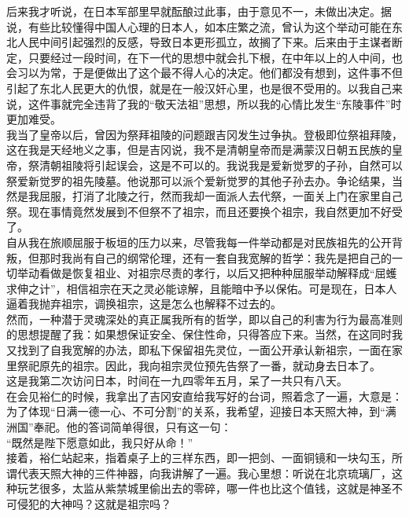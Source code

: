 后来我才听说，在日本军部里早就酝酿过此事，由于意见不一，未做出决定。据说，有些比较懂得中国人心理的日本人，如本庄繁之流，曾认为这个举动可能在东北人民中间引起强烈的反感，导致日本更形孤立，故搁了下来。后来由于主谋者断定，只要经过一段时间，在下一代的思想中就会扎下根，在中年以上的人中间，也会习以为常，于是便做出了这个最不得人心的决定。他们都没有想到，这件事不但引起了东北人民更大的仇恨，就是在一般汉奸心里，也是很不受用的。以我自己来说，这件事就完全违背了我的“敬天法祖”思想，所以我的心情比发生“东陵事件”时更加难受。\\

我当了皇帝以后，曾因为祭拜祖陵的问题跟吉冈发生过争执。登极即位祭祖拜陵，这在我是天经地义之事，但是吉冈说，我不是清朝皇帝而是满蒙汉日朝五民族的皇帝，祭清朝祖陵将引起误会，这是不可以的。我说我是爱新觉罗的子孙，自然可以祭爱新觉罗的祖先陵墓。他说那可以派个爱新觉罗的其他子孙去办。争论结果，当然是我屈服，打消了北陵之行，然而我却一面派人去代祭，一面关上门在家里自己祭。现在事情竟然发展到不但祭不了祖宗，而且还要换个祖宗，我自然更加不好受了。\\

自从我在旅顺屈服于板垣的压力以来，尽管我每一件举动都是对民族祖先的公开背叛，但那时我尚有自己的纲常伦理，还有一套自我宽解的哲学：我先是把自己的一切举动看做是恢复祖业、对祖宗尽责的孝行，以后又把种种屈服举动解释成“屈蠖求伸之计”，相信祖宗在天之灵必能谅解，且能暗中予以保佑。可是现在，日本人逼着我抛弃祖宗，调换祖宗，这是怎么也解释不过去的。\\

然而，一种潜于灵魂深处的真正属我所有的哲学，即以自己的利害为行为最高准则的思想提醒了我：如果想保证安全、保住性命，只得答应下来。当然，在这同时我又找到了自我宽解的办法，即私下保留祖先灵位，一面公开承认新祖宗，一面在家里祭祀原先的祖宗。因此，我向祖宗灵位预先告祭了一番，就动身去日本了。\\

这是我第二次访问日本，时间在一九四零年五月，呆了一共只有八天。\\

在会见裕仁的时候，我拿出了吉冈安直给我写好的台词，照着念了一遍，大意是：为了体现“日满一德一心、不可分割”的关系，我希望，迎接日本天照大神，到“满洲国”奉祀。他的答词简单得很，只有这一句：\\

“既然是陛下愿意如此，我只好从命！”\\

接着，裕仁站起来，指着桌子上的三样东西，即一把剑、一面铜镜和一块勾玉，所谓代表天照大神的三件神器，向我讲解了一遍。我心里想：听说在北京琉璃厂，这种玩艺很多，太监从紫禁城里偷出去的零碎，哪一件也比这个值钱，这就是神圣不可侵犯的大神吗？这就是祖宗吗？\\

